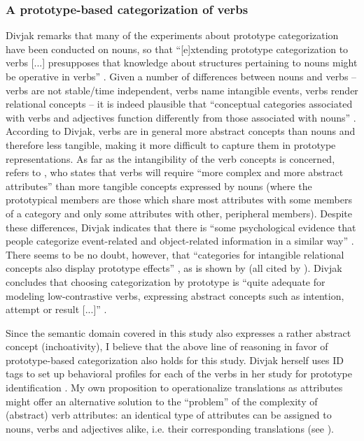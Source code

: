 \subsubsection{A prototype-based categorization of verbs}
\label{sec:2.4.3.2} 
Divjak remarks that many of the experiments about prototype categorization have been conducted on nouns, so that “[e]xtending prototype categorization to verbs [...] presupposes that knowledge about structures pertaining to nouns might be operative in verbs” \citep[150]{divjak_structuring_2010}. Given a number of differences between nouns and verbs – verbs are not stable\slash time independent, verbs name intangible events, verbs render relational concepts \citep{divjak_structuring_2010} – it is indeed plausible that “conceptual categories associated with verbs and adjectives function differently from those associated with nouns” \citep{divjak_structuring_2010}. According to Divjak, verbs are in general more abstract concepts than nouns and therefore less tangible, making it more difficult to capture them in prototype representations. As far as the intangibility of the verb concepts is concerned, \citet[152]{divjak_structuring_2010} refers to \citet[114]{pulman_word_1983}, who states that verbs will require “more complex and more abstract attributes” than more tangible concepts expressed by nouns (where the prototypical members are those which share most attributes with some members of a category and only some attributes with other, peripheral members). Despite these differences, Divjak indicates that there is “some psychological evidence that people categorize event-related and object-related information in a similar way” \citep[151]{divjak_structuring_2010}. There seems to be no doubt, however, that “categories for intangible relational concepts also display prototype effects” \citep[153]{divjak_structuring_2010}, as is shown by \citet{schmid_cottage_1993,taylor_linguistic_1995,taylor_linguistic_2003,geeraerts_preponderantieverschillen_1985, rudzka-ostyn_where_1988, geeraerts_homonymy_1990} (all cited by \citealt[153]{divjak_structuring_2010}). Divjak concludes that choosing categorization by prototype is “quite adequate for modeling low-contrastive verbs, expressing abstract concepts such as intention, attempt or result [...]” \citep[150]{divjak_structuring_2010}.

Since the semantic domain covered in this study also expresses a rather abstract concept (inchoativity), I believe that the above line of reasoning in favor of prototype-based categorization also holds for this study. Divjak herself uses ID tags to set up behavioral profiles for each of the verbs in her study for prototype identification \citep[158]{divjak_structuring_2010}. My own proposition to operationalize translations as attributes might offer an alternative solution to the ``problem'' of the complexity of (abstract) verb attributes: an identical type of attributes can be assigned to nouns, verbs and adjectives alike, i.e. their corresponding translations (see ).

